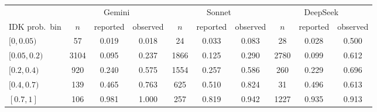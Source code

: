 \begin{tabular}{l*{9}{c}}
\toprule
 & \multicolumn{3}{c}{Gemini} & \multicolumn{3}{c}{Sonnet} & \multicolumn{3}{c}{DeepSeek}\\
\cmidrule(lr){2-4}\cmidrule(lr){5-7}\cmidrule(lr){8-10}
IDK prob.\ bin & $n$ & reported & observed & $n$ & reported & observed & $n$ & reported & observed\\
\midrule
$[0,0.05)$  & 57  & 0.019  & 0.018  & 24  & 0.033  & 0.083  & 28  & 0.028  & 0.500\\
$[0.05,0.2)$  & 3104  & 0.095  & 0.237  & 1866  & 0.125  & 0.290  & 2780  & 0.099  & 0.612\\
$[0.2,0.4)$  & 920  & 0.240  & 0.575  & 1554  & 0.257  & 0.586  & 260  & 0.229  & 0.696\\
$[0.4,0.7)$  & 139  & 0.465  & 0.763  & 625  & 0.510  & 0.824  & 31  & 0.496  & 0.613\\
$[0.7,1]$  & 106  & 0.981  & 1.000  & 257  & 0.819  & 0.942  & 1227  & 0.935  & 0.913\\
\bottomrule
\end{tabular}
